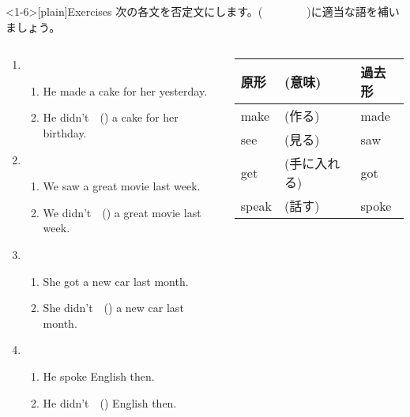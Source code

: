\documentclass[aspectratio=169,xcolor={dvipsnames,table}]{beamer}
\begin{document}
\begin{frame}<1-6>[plain]{Exercises}
 次の各文を否定文にします。(~~~~~~~~)に適当な語を補いましょう。

\begin{columns}
\begin{column}{.6\textwidth}
\begin{enumerate}
 \item \begin{enumerate}
	\item He made a cake for her yesterday.
	\item He didn't~~() a cake for her birthday.
       \end{enumerate}
 \item \begin{enumerate}
	\item We saw a great movie last week.
	\item We didn't~~() a great movie last week.
       \end{enumerate}
 \item \begin{enumerate}
	\item She got a new car last month.
	\item She didn't~~() a new car last month.
       \end{enumerate}
 \item \begin{enumerate}
	\item He spoke English then.
	\item He didn't~~() English then.
       \end{enumerate}
\end{enumerate}
\end{column}
\begin{column}{.35\textwidth}
{
\begin{tabular}{lll}\toprule
{\small 原形}&{\small (意味)}&{\small 過去形}\\\midrule
{make}&{{\small (作る)}}&{made}\\
{see}&{{\small (見る)}}&{saw}\\
{get}&{{\small (手に入れる)}}&{got}\\
{speak}&{{\small(話す)}}&{spoke}\\
\bottomrule
\end{tabular}}%

\end{column}
\end{columns}
\end{frame}
\end{document}
